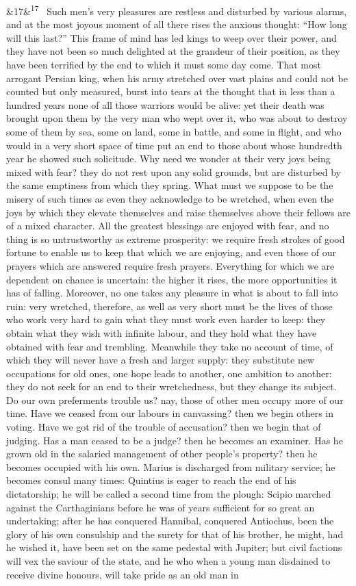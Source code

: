\documentclass[12pt]{article}
\newcommand{\para}[1][]{\par\noindent\ifx&#1&\else\textsuperscript{\footnotesize #1}~\fi}
\begin{document}
\para[17] Such men’s very pleasures are restless and disturbed by various alarms, and at the most joyous moment of all there rises the anxious thought: “How long will this last?” This frame of mind has led kings to weep over their power, and they have not been so much delighted at the grandeur of their position, as they have been terrified by the end to which it must some day come. That most arrogant Persian king, when his army stretched over vast plains and could not be counted but only measured, burst into tears at the thought that in less than a hundred years none of all those warriors would be alive: yet their death was brought upon them by the very man who wept over it, who was about to destroy some of them by sea, some on land, some in battle, and some in flight, and who would in a very short space of time put an end to those about whose hundredth year he showed such solicitude. Why need we wonder at their very joys being mixed with fear? they do not rest upon any solid grounds, but are disturbed by the same emptiness from which they spring. What must we suppose to be the misery of such times as even they acknowledge to be wretched, when even the joys by which they elevate themselves and raise themselves above their fellows are of a mixed character. All the greatest blessings are enjoyed with fear, and no thing is so untrustworthy as extreme prosperity: we require fresh strokes of good fortune to enable us to keep that which we are enjoying, and even those of our prayers which are answered require fresh prayers. Everything for which we are dependent on chance is uncertain: the higher it rises, the more opportunities it has of falling. Moreover, no one takes any pleasure in what is about to fall into ruin: very wretched, therefore, as well as very short must be the lives of those who work very hard to gain what they must work even harder to keep: they obtain what they wish with infinite labour, and they hold what they have obtained with fear and trembling. Meanwhile they take no account of time, of which they will never have a fresh and larger supply: they substitute new occupations for old ones, one hope leads to another, one ambition to another: they do not seek for an end to their wretchedness, but they change its subject. Do our own preferments trouble us? nay, those of other men occupy more of our time. Have we ceased from our labours in canvassing? then we begin others in voting. Have we got rid of the trouble of accusation? then we begin that of judging. Has a man ceased to be a judge? then he becomes an examiner. Has he grown old in the salaried management of other people’s property? then he becomes occupied with his own. Marius is discharged from military service; he becomes consul many times: Quintius is eager to reach the end of his dictatorship; he will be called a second time from the plough: Scipio marched against the Carthaginians before he was of years sufficient for so great an undertaking; after he has conquered Hannibal, conquered Antiochus, been the glory of his own consulship and the surety for that of his brother, he might, had he wished it, have been set on the same pedestal with Jupiter; but civil factions will vex the saviour of the state, and he who when a young man disdained to receive divine honours, will take pride as an old man in 
\end{document}
